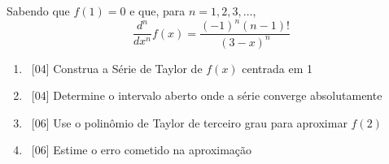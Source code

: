 \documentclass[a4paper,12pt,fleqn]{article}
\begin{document}
Sabendo que \(f(1)=0\) e que, para \(n=1, 2, 3, \dots\),
\[
  \frac{d^n}{dx^n}f(x) = \frac{(-1)^n(n-1)!}{(3-x)^n}
\]
\begin{enumerate}[label=\alph*)]
  \item\ [04] Construa a Série de Taylor de $f(x)$ centrada em 1
  \item\ [04] Determine o intervalo aberto onde a série converge absolutamente
  \item\ [06] Use o polinômio de Taylor de terceiro grau para aproximar \(f(2)\)
  \item\ [06] Estime o erro cometido na aproximação
\end{enumerate}
\end{document}
